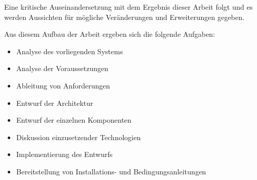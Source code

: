 Eine kritische Auseinandersetzung mit dem Ergebnis dieser Arbeit folgt und es werden Aussichten für mögliche Veränderungen und Erweiterungen gegeben.

Aus diesem Aufbau der Arbeit ergeben sich die folgende Aufgaben:
\begin{itemize}
	\item Analyse des vorliegenden Systems
	\item Analyse der Voraussetzungen
	\item Ableitung von Anforderungen
	\item Entwurf der Architektur
	\item Entwurf der einzelnen Komponenten
	\item Diskussion einzusetzender Technologien
	\item Implementierung des Entwurfs
	\item Bereitstellung von Installations- und Bedingungsanleitungen
\end{itemize}